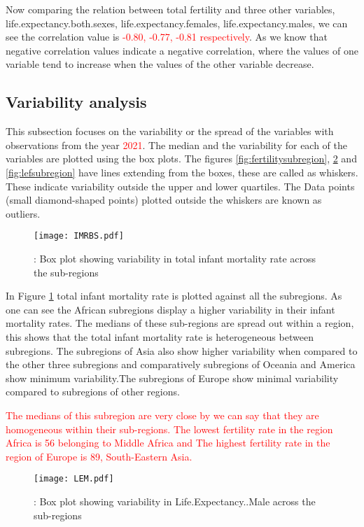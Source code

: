 \documentclass[12 pt]{scrartcl}
\newcommand{\red}{\textcolor{red}}
\begin{document}
	Now comparing the relation between total fertility and three other variables, life.expectancy.both.sexes, life.expectancy.females, life.expectancy.males, we can see the correlation value is\red{ -0.80, -0.77, -0.81 respectively}. As we know that negative correlation values indicate a negative correlation, where the values of one variable tend to increase when the values of the other variable decrease.
	
	
	
	
	
	
	\subsection{ Variability analysis}
	
	This subsection focuses on the variability or the spread of the variables with observations from the year \red{2021}. The median and the variability for each of the variables are plotted using the box plots. The figures \ref{fig:fertilitysubregion}, \ref{fig:lemsubregion} and \ref{fig:lefsubregion} have lines extending from the boxes, these are called as whiskers. These indicate variability outside the upper and lower quartiles. The Data points (small diamond-shaped points) plotted outside the whiskers are known as outliers.
	
	\begin{figure}[h!]
		\centering
		\texttt{[image: IMRBS.pdf]}
		\caption{: Box plot showing variability in total infant mortality rate across the sub-regions
		}
		\label{fig:imrbssubregion}
	\end{figure}
	
	In Figure \ref{fig:imrbssubregion} total infant mortality rate is plotted against all the subregions. As one can see the  African subregions display a higher variability in their infant mortality rates. The medians of these sub-regions are spread out within a region, this shows that the total infant mortality rate is heterogeneous between subregions. The subregions of Asia also show higher variability when compared to the other three subregions and comparatively subregions of Oceania and America show minimum variability.The subregions of Europe show minimal variability compared to subregions of other regions. 
	
	\red{The medians of this subregion are very close by we can say that they are homogeneous within their sub-regions. The lowest fertility rate in the region Africa is 56 belonging to Middle Africa and The highest fertility rate in the region of Europe is 89, South-Eastern Asia.
	}
	\begin{figure}[h!]
		\centering
		\texttt{[image: LEM.pdf]}
		\caption{: Box plot showing variability in Life.Expectancy..Male across the sub-regions}
		\label{fig:lemsubregion}
	\end{figure}
	
\end{document}
